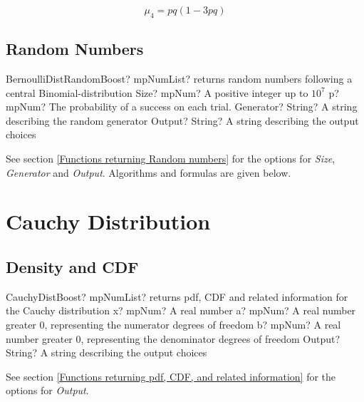 \begin{equation} 
	\mu_4 = pq (1-3pq)
\end{equation}



\subsection{Random Numbers}
\begin{mpFunctionsExtract}
	\mpFunctionFour
	{BernoulliDistRandomBoost? mpNumList? returns random numbers following a central Binomial-distribution}
	{Size? mpNum? A positive integer up to $10^7$}
	{p? mpNum? The probability of a success on each trial.}
	{Generator? String? A string describing the random generator}
	{Output? String? A string describing the output choices}
\end{mpFunctionsExtract}

\vspace{0.3cm}

See section \ref{Functions returning Random numbers} for the options for  {\itshape\sffamily Size},  {\itshape\sffamily Generator} and {\itshape\sffamily Output}. Algorithms and formulas are given below.




\section{Cauchy Distribution}
\label{CauchyDistribution}



\subsection{Density and CDF}

\begin{mpFunctionsExtract}
	\mpFunctionFour
	{CauchyDistBoost? mpNumList? returns pdf, CDF and related information for the Cauchy distribution}
	{x? mpNum? A real number}
	{a? mpNum? A real number greater 0, representing the numerator  degrees of freedom}
	{b? mpNum? A real number greater 0, representing the denominator degrees of freedom}
	{Output? String? A string describing the output choices}
\end{mpFunctionsExtract}


\vspace{0.3cm}
See section \ref{Functions returning pdf, CDF, and related information} for the options for {\itshape\sffamily Output}. 


